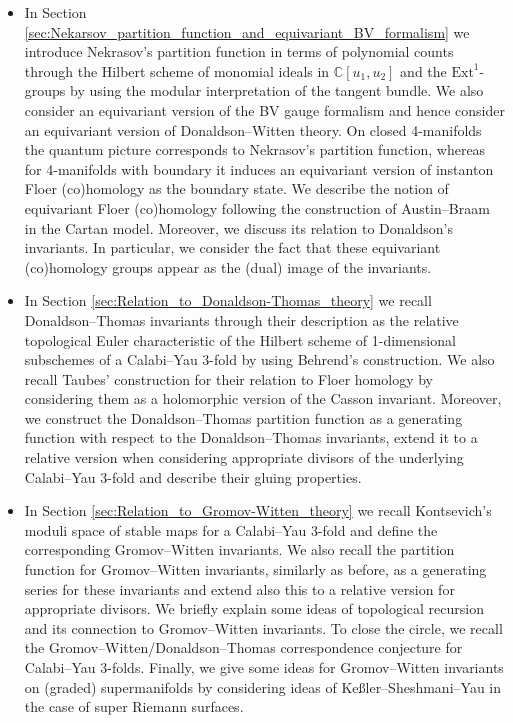 \documentclass[11pt,colorinlistoftodos]{amsart}
\numberwithin{equation}{subsection}
\theoremstyle{plain}
\theoremstyle{definition}
\theoremstyle{remark}
\newcommand{\C}{\mathbb{C}}
\begin{document}
\begin{itemize}
    \item In Section \ref{sec:Nekarsov_partition_function_and_equivariant_BV_formalism} we introduce Nekrasov's partition function in terms of polynomial counts through the Hilbert scheme of monomial ideals in $\C[u_1,u_2]$ and the $\mathrm{Ext}^1$-groups by using the modular interpretation of the tangent bundle. We also consider an equivariant version of the BV gauge formalism and hence consider an equivariant version of Donaldson--Witten theory. On closed 4-manifolds the quantum picture corresponds to Nekrasov's partition function, whereas for 4-manifolds with boundary it induces an equivariant version of instanton Floer (co)homology as the boundary state. We describe the notion of equivariant Floer (co)homology following the construction of Austin--Braam in the Cartan model. Moreover, we discuss its relation to Donaldson's invariants. In particular, we consider the fact that these equivariant (co)homology groups appear as the (dual) image of the invariants.
    \item In Section \ref{sec:Relation_to_Donaldson-Thomas_theory} we recall Donaldson--Thomas invariants through their description as the relative topological Euler characteristic of the Hilbert scheme of 1-dimensional subschemes of a Calabi--Yau 3-fold by using Behrend's construction. We also recall Taubes' construction for their relation to Floer homology by considering  them as a holomorphic version of the Casson invariant. Moreover, we construct the Donaldson--Thomas partition function as a generating function with respect to the Donaldson--Thomas invariants, extend it to a relative version when considering appropriate divisors of the underlying Calabi--Yau 3-fold and describe their gluing properties.  
    \item In Section \ref{sec:Relation_to_Gromov-Witten_theory} we recall Kontsevich's moduli space of stable maps for a Calabi--Yau 3-fold and define the corresponding Gromov--Witten invariants. We also recall the partition function for Gromov--Witten invariants, similarly as before, as a generating series for these invariants and extend also this to a relative version for appropriate divisors. We briefly explain some ideas of topological recursion and its connection to Gromov--Witten invariants. To close the circle, we recall the Gromov--Witten/Donaldson--Thomas correspondence conjecture for Calabi--Yau 3-folds. Finally, we give some ideas for Gromov--Witten invariants on (graded) supermanifolds by considering ideas of Ke\ss ler--Sheshmani--Yau in the case of super Riemann surfaces. 
\end{itemize}
\end{document}
